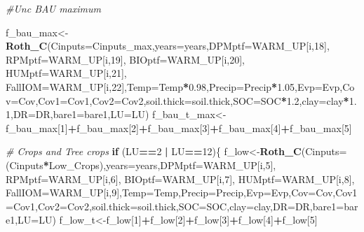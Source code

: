 \documentclass[
  10pt,
  b5paper,
]{book}
\newenvironment{Shaded}{\begin{snugshade}}{\end{snugshade}}
\newcommand{\CommentTok}[1]{\textcolor[rgb]{0.56,0.35,0.01}{\textit{#1}}}
\newcommand{\ControlFlowTok}[1]{\textcolor[rgb]{0.13,0.29,0.53}{\textbf{#1}}}
\newcommand{\DataTypeTok}[1]{\textcolor[rgb]{0.13,0.29,0.53}{#1}}
\newcommand{\DecValTok}[1]{\textcolor[rgb]{0.00,0.00,0.81}{#1}}
\newcommand{\FloatTok}[1]{\textcolor[rgb]{0.00,0.00,0.81}{#1}}
\newcommand{\KeywordTok}[1]{\textcolor[rgb]{0.13,0.29,0.53}{\textbf{#1}}}
\newcommand{\NormalTok}[1]{#1}
\newcommand{\OperatorTok}[1]{\textcolor[rgb]{0.81,0.36,0.00}{\textbf{#1}}}
\newcommand{\StringTok}[1]{\textcolor[rgb]{0.31,0.60,0.02}{#1}}
\begin{document}
\begin{Shaded}
\begin{Highlighting}[]
{\CommentTok{#Unc BAU maximum}

\NormalTok{f_bau_max<-}\KeywordTok{Roth_C}\NormalTok{(}\DataTypeTok{Cinputs=}\NormalTok{Cinputs_max,}\DataTypeTok{years=}\NormalTok{years,}\DataTypeTok{DPMptf=}\NormalTok{WARM_UP[i,}\DecValTok{18}\NormalTok{], }\DataTypeTok{RPMptf=}\NormalTok{WARM_UP[i,}\DecValTok{19}\NormalTok{], }\DataTypeTok{BIOptf=}\NormalTok{WARM_UP[i,}\DecValTok{20}\NormalTok{], }\DataTypeTok{HUMptf=}\NormalTok{WARM_UP[i,}\DecValTok{21}\NormalTok{], }\DataTypeTok{FallIOM=}\NormalTok{WARM_UP[i,}\DecValTok{22}\NormalTok{],}\DataTypeTok{Temp=}\NormalTok{Temp}\OperatorTok{*}\FloatTok{0.98}\NormalTok{,}\DataTypeTok{Precip=}\NormalTok{Precip}\OperatorTok{*}\FloatTok{1.05}\NormalTok{,}\DataTypeTok{Evp=}\NormalTok{Evp,}\DataTypeTok{Cov=}\NormalTok{Cov,}\DataTypeTok{Cov1=}\NormalTok{Cov1,}\DataTypeTok{Cov2=}\NormalTok{Cov2,}\DataTypeTok{soil.thick=}\NormalTok{soil.thick,}\DataTypeTok{SOC=}\NormalTok{SOC}\OperatorTok{*}\FloatTok{1.2}\NormalTok{,}\DataTypeTok{clay=}\NormalTok{clay}\OperatorTok{*}\FloatTok{1.1}\NormalTok{,}\DataTypeTok{DR=}\NormalTok{DR,}\DataTypeTok{bare1=}\NormalTok{bare1,}\DataTypeTok{LU=}\NormalTok{LU)}
\NormalTok{f_bau_t_max<-f_bau_max[}\DecValTok{1}\NormalTok{]}\OperatorTok{+}\NormalTok{f_bau_max[}\DecValTok{2}\NormalTok{]}\OperatorTok{+}\NormalTok{f_bau_max[}\DecValTok{3}\NormalTok{]}\OperatorTok{+}\NormalTok{f_bau_max[}\DecValTok{4}\NormalTok{]}\OperatorTok{+}\NormalTok{f_bau_max[}\DecValTok{5}\NormalTok{]}

\CommentTok{# Crops and Tree crops}
\ControlFlowTok{if}\NormalTok{ (LU}\OperatorTok{==}\DecValTok{2} \OperatorTok{|}\StringTok{ }\NormalTok{LU}\OperatorTok{==}\DecValTok{12}\NormalTok{)\{}
\NormalTok{f_low<-}\KeywordTok{Roth_C}\NormalTok{(}\DataTypeTok{Cinputs=}\NormalTok{(Cinputs}\OperatorTok{*}\NormalTok{Low_Crops),}\DataTypeTok{years=}\NormalTok{years,}\DataTypeTok{DPMptf=}\NormalTok{WARM_UP[i,}\DecValTok{5}\NormalTok{], }\DataTypeTok{RPMptf=}\NormalTok{WARM_UP[i,}\DecValTok{6}\NormalTok{], }\DataTypeTok{BIOptf=}\NormalTok{WARM_UP[i,}\DecValTok{7}\NormalTok{], }\DataTypeTok{HUMptf=}\NormalTok{WARM_UP[i,}\DecValTok{8}\NormalTok{], }\DataTypeTok{FallIOM=}\NormalTok{WARM_UP[i,}\DecValTok{9}\NormalTok{],}\DataTypeTok{Temp=}\NormalTok{Temp,}\DataTypeTok{Precip=}\NormalTok{Precip,}\DataTypeTok{Evp=}\NormalTok{Evp,}\DataTypeTok{Cov=}\NormalTok{Cov,}\DataTypeTok{Cov1=}\NormalTok{Cov1,}\DataTypeTok{Cov2=}\NormalTok{Cov2,}\DataTypeTok{soil.thick=}\NormalTok{soil.thick,}\DataTypeTok{SOC=}\NormalTok{SOC,}\DataTypeTok{clay=}\NormalTok{clay,}\DataTypeTok{DR=}\NormalTok{DR,}\DataTypeTok{bare1=}\NormalTok{bare1,}\DataTypeTok{LU=}\NormalTok{LU)}
\NormalTok{f_low_t<-f_low[}\DecValTok{1}\NormalTok{]}\OperatorTok{+}\NormalTok{f_low[}\DecValTok{2}\NormalTok{]}\OperatorTok{+}\NormalTok{f_low[}\DecValTok{3}\NormalTok{]}\OperatorTok{+}\NormalTok{f_low[}\DecValTok{4}\NormalTok{]}\OperatorTok{+}\NormalTok{f_low[}\DecValTok{5}\NormalTok{]}

}
\end{Highlighting}
\end{Shaded}
\end{document}
